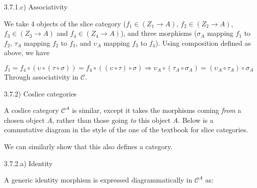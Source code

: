 \documentclass[12pt, letterpaper, twoside]{report}
\begin{document}
3.7.1.c) Associativity

We take 4 objects of the slice category ($f_1 \in (Z_1 \to A)$, $f_2 \in (Z_2 \to A)$, $f_3 \in (Z_3 \to A)$ and  $f_4 \in (Z_4 \to A)$), and three morphisms ($\sigma_A$ mapping $f_1$ to $f_2$, $\tau_A$ mapping $f_2$ to $f_3$, and $\upsilon_A$ mapping $f_3$ to $f_4$). Using composition defined as above, we have

$$
f_1 = f_4 \circ ( \upsilon \circ (\tau  \circ \sigma))
	= f_4 \circ ((\upsilon \circ  \tau) \circ \sigma )
\Rightarrow
   \upsilon_A \circ (\tau_A  \circ \sigma_A)
= (\upsilon_A \circ  \tau_A) \circ \sigma_A
$$
Through associativity in $\mathcal{C}$.


3.7.2) Coslice categories

A coslice category $\mathcal{C}^A$ is similar, except it takes the morphisms coming \textit{from} a chosen object $A$, rather than those going \textit{to} this object $A$. Below is a commutative diagram in the style of the one of the textbook for slice categories.


We can similarly show that this also defines a category.

3.7.2.a) Identity

A generic identity morphism is expressed diagrammatically in $\mathcal{C}^A$ as:

\end{document}
